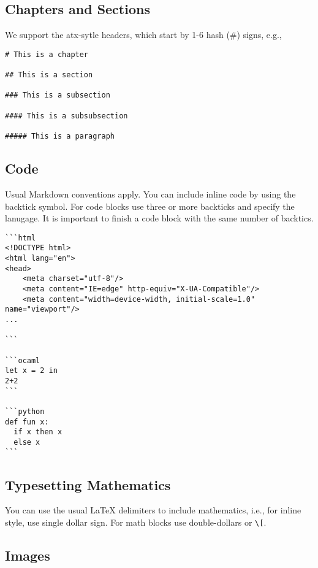 \subsection{Chapters and Sections}

We support the atx-sytle headers, which start by 1-6 hash (\#) signs, e.g.,
\begin{lstlisting}
# This is a chapter

## This is a section

### This is a subsection

#### This is a subsubsection

##### This is a paragraph
\end{lstlisting}



\subsection{Code}
\label{sec:dc::md::code}

Usual Markdown conventions apply.  You can include inline code by using the backtick symbol. For code blocks use three or more backticks and specify the lanugage. It is important to finish a code block with the same number of backtics.

\begin{example}
\begin{lstlisting}
```html
<!DOCTYPE html>
<html lang="en">
<head>
    <meta charset="utf-8"/>
    <meta content="IE=edge" http-equiv="X-UA-Compatible"/>
    <meta content="width=device-width, initial-scale=1.0" name="viewport"/>
...

```

```ocaml
let x = 2 in
2+2
```

```python
def fun x:
  if x then x
  else x
```
\end{lstlisting}
\end{example} 

\subsection{Typesetting Mathematics}

You can use the usual LaTeX delimiters to include mathematics, i.e., for inline style, use single dollar sign.
%
For math blocks use double-dollars or \lstinline`\[`.

\subsection{Images}

